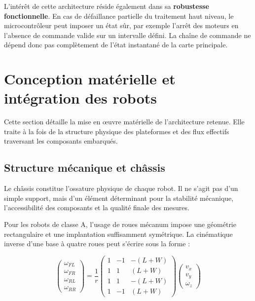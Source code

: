 \documentclass[11pt,a4paper]{report}
\newcommand{\kw}[1]{\textbf{#1}}
\begin{document}
L’intérêt de cette architecture réside également dans sa \kw{robustesse fonctionnelle}. En cas de défaillance partielle du traitement haut niveau, le microcontrôleur peut imposer un état sûr, par exemple l’arrêt des moteurs en l’absence de commande valide sur un intervalle défini. La chaîne de commande ne dépend donc pas complètement de l’état instantané de la carte principale.

\section{Conception matérielle et intégration des robots}

Cette section détaille la mise en œuvre matérielle de l’architecture retenue. Elle traite à la fois de la structure physique des plateformes et des flux effectifs traversant les composants embarqués.

\subsection{Structure mécanique et châssis}

Le châssis constitue l’ossature physique de chaque robot. Il ne s’agit pas d’un simple support, mais d’un élément déterminant pour la stabilité mécanique, l’accessibilité des composants et la qualité finale des mesures.

Pour les robots de classe A, l’usage de roues mécanum impose une géométrie rectangulaire et une implantation suffisamment symétrique. La cinématique inverse d’une base à quatre roues peut s’écrire sous la forme :

\[
\begin{pmatrix}
\omega_{FL} \\
\omega_{FR} \\
\omega_{RL} \\
\omega_{RR}
\end{pmatrix}
=
\frac{1}{r}
\begin{pmatrix}
1 & -1 & -(L+W) \\
1 & 1 & (L+W) \\
1 & 1 & -(L+W) \\
1 & -1 & (L+W)
\end{pmatrix}
\begin{pmatrix}
v_x \\
v_y \\
\omega_z
\end{pmatrix}
\]
\end{document}
